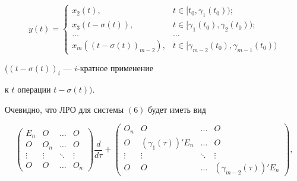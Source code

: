 \begin{equation}


y(t) =


\begin{cases}


x_2(t), & t \in [t_0, \gamma_1(t_0)); \\


x_3(t- \sigma (t)), & t \in [\gamma_1(t_0),\gamma_2(t_0)); \\


\dotsc & \dotsc \\


x_m((t-\sigma(t))_{m-2}),&


t \in [\gamma_{m-2} (t_0), \gamma_{m-1} (t_0))


\end{cases}


\end{equation}


($(t- \sigma (t))_i$ --- $i$-кратное применение


к $t$ операции $t-\sigma(t))$.





Очевидно, что ЛРО для системы $(6)$ будет иметь вид


\begin{equation}


\begin{pmatrix}


E_n & O & \dotsc & O\\


O & O_n & \dotsc & O\\


\vdots & \vdots & \ddots & \vdots \\


O & O & \dotsc & O_n 


\end{pmatrix}


\frac{d}{d \tau} +


\begin{pmatrix}


O_n & O & \dotsc & O\\


O & (\gamma_1 (\tau))'E_n & \dotsc & O\\


\vdots & \vdots & \ddots & \vdots \\


O & O & \dotsc & (\gamma_{m-2}(\tau))'E_n


\end{pmatrix}


,


\end{equation}


